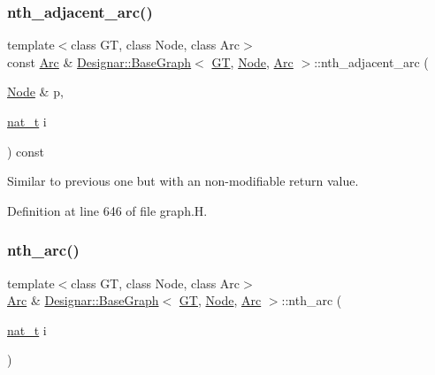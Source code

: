 \subsubsection{\texorpdfstring{nth\+\_\+adjacent\+\_\+arc()}{nth\_adjacent\_arc()}\hspace{0.1cm}{\footnotesize\ttfamily [2/2]}}
{\footnotesize\ttfamily template$<$class GT, class Node, class Arc$>$ \\
const \hyperlink{namespace_designar_a3f55fb5513d62ff47cbc8f72b8e95d6f}{Arc} \& \hyperlink{class_designar_1_1_base_graph}{Designar\+::\+Base\+Graph}$<$ \hyperlink{demo-buildgraph_8_c_a3001c40d2c31ca87ed96cd7d1334a55e}{GT}, \hyperlink{namespace_designar_a5af326c65aa2bd26b26c410f2030d09e}{Node}, \hyperlink{namespace_designar_a3f55fb5513d62ff47cbc8f72b8e95d6f}{Arc} $>$\+::nth\+\_\+adjacent\+\_\+arc (\begin{DoxyParamCaption}\item[{\hyperlink{namespace_designar_a5af326c65aa2bd26b26c410f2030d09e}{Node} \&}]{p,  }\item[{\hyperlink{namespace_designar_aa72662848b9f4815e7bf31a7cf3e33d1}{nat\+\_\+t}}]{i }\end{DoxyParamCaption}) const\hspace{0.3cm}{\ttfamily [inline]}}



Similar to previous one but with an non-\/modifiable return value. 



Definition at line 646 of file graph.\+H.

\mbox{\label{class_designar_1_1_base_graph_a3fed87a68cc763e63369558423235e00}} 
\subsubsection{\texorpdfstring{nth\+\_\+arc()}{nth\_arc()}\hspace{0.1cm}{\footnotesize\ttfamily [1/2]}}
{\footnotesize\ttfamily template$<$class GT, class Node, class Arc$>$ \\
\hyperlink{namespace_designar_a3f55fb5513d62ff47cbc8f72b8e95d6f}{Arc} \& \hyperlink{class_designar_1_1_base_graph}{Designar\+::\+Base\+Graph}$<$ \hyperlink{demo-buildgraph_8_c_a3001c40d2c31ca87ed96cd7d1334a55e}{GT}, \hyperlink{namespace_designar_a5af326c65aa2bd26b26c410f2030d09e}{Node}, \hyperlink{namespace_designar_a3f55fb5513d62ff47cbc8f72b8e95d6f}{Arc} $>$\+::nth\+\_\+arc (\begin{DoxyParamCaption}\item[{\hyperlink{namespace_designar_aa72662848b9f4815e7bf31a7cf3e33d1}{nat\+\_\+t}}]{i }\end{DoxyParamCaption})\hspace{0.3cm}{\ttfamily [inline]}}



